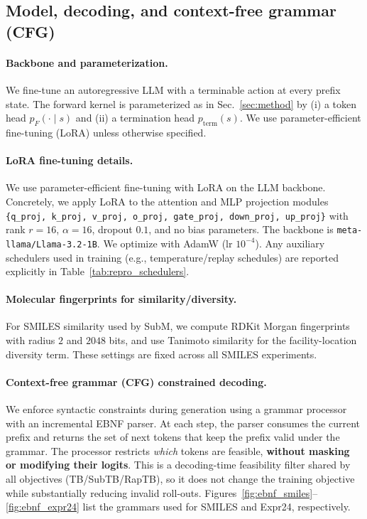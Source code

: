 \documentclass{article}
\theoremstyle{plain}
\theoremstyle{definition}
\theoremstyle{remark}
\begin{document}
\subsection{Model, decoding, and context-free grammar (CFG)}
\label{app:repro_cfg}

\paragraph{Backbone and parameterization.}
We fine-tune an autoregressive LLM with a terminable action at every prefix state.
The forward kernel is parameterized as in Sec.~\ref{sec:method} by (i) a token head $p_F(\cdot\mid s)$ and
(ii) a termination head $p_{\mathrm{term}}(s)$.
We use parameter-efficient fine-tuning (LoRA) unless otherwise specified.

\paragraph{LoRA fine-tuning details.}
We use parameter-efficient fine-tuning with LoRA on the LLM backbone.
Concretely, we apply LoRA to the attention and MLP projection modules
\texttt{\{q\_proj, k\_proj, v\_proj, o\_proj, gate\_proj, down\_proj, up\_proj\}}
with rank $r{=}16$, $\alpha{=}16$, dropout $0.1$, and no bias parameters.
The backbone is \texttt{meta-llama/Llama-3.2-1B}.
We optimize with AdamW (lr $10^{-4}$). Any auxiliary schedulers used in training (e.g., temperature/replay schedules)
are reported explicitly in Table~\ref{tab:repro_schedulers}.

\paragraph{Molecular fingerprints for similarity/diversity.}
For SMILES similarity used by SubM, we compute RDKit Morgan fingerprints with radius $2$ and $2048$ bits,
and use Tanimoto similarity for the facility-location diversity term. These settings are fixed across all SMILES experiments.


\paragraph{Context-free grammar (CFG) constrained decoding.}
We enforce syntactic constraints during generation using a grammar processor with an incremental EBNF parser.
At each step, the parser consumes the current prefix and returns the set of next tokens that keep the prefix valid under
the grammar. The processor restricts \emph{which} tokens are feasible,\textbf{ without masking or modifying their logits}.
This is a decoding-time feasibility filter shared by all objectives (TB/SubTB/RapTB), so it does not change the training objective while substantially reducing invalid roll-outs.
Figures~\ref{fig:ebnf_smiles}--\ref{fig:ebnf_expr24} list the grammars used for SMILES and Expr24, respectively.
\end{document}
